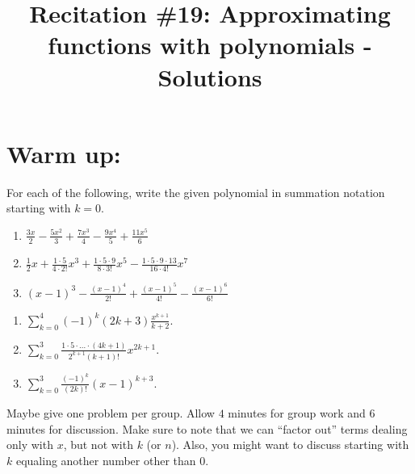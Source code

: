 \documentclass[noinstructornotes]{ximera}
\title{Recitation \#19: Approximating functions with polynomials - Solutions}
\begin{document}
\begin{abstract}		\end{abstract}
\maketitle


\section{Warm up:}
For each of the following, write the given polynomial in summation notation starting with $k=0$.
	\begin{enumerate}
	
	\item  $\frac{3x}{2} - \frac{5x^2}{3} + \frac{7x^3}{4} - \frac{9x^4}{5} + \frac{11x^5}{6}$
	
	\item  $\frac{1}{2}x + \frac{1 \cdot 5}{4 \cdot 2!}x^3 + \frac{1 \cdot 5 \cdot 9}{8 \cdot 3!}x^5 - \frac{1 \cdot 5 \cdot 9 \cdot 13}{16 \cdot 4!}x^7$
	
	\item  $(x-1)^3 - \frac{(x-1)^4}{2!} + \frac{(x-1)^5}{4!} - \frac{(x-1)^6}{6!} $
	
	\end{enumerate}
	
	\begin{freeResponse}
	\begin{enumerate}
	
	\item  $\sum_{k=0}^4 (-1)^k (2k+3) \frac{x^{k+1}}{k+2}$.  
	
	\item  $\sum_{k=0}^3 \frac{1 \cdot 5 \cdot \hdots \cdot (4k+1)}{2^{k+1} (k+1)!} x^{2k+1}.$
	
	\item  $\sum_{k=0}^3 \frac{(-1)^k}{(2k)!} (x-1)^{k+3}$.  
	
	\end{enumerate}
	\end{freeResponse}
	
\begin{instructorNotes}
Maybe give one problem per group.  
Allow $4$ minutes for group work and $6$ minutes for discussion.  
Make sure to note that we can ``factor out'' terms dealing only with $x$, but not with $k$ (or $n$).  
Also, you might want to discuss starting with $k$ equaling another number other than $0$.
\end{instructorNotes}
\end{document}
